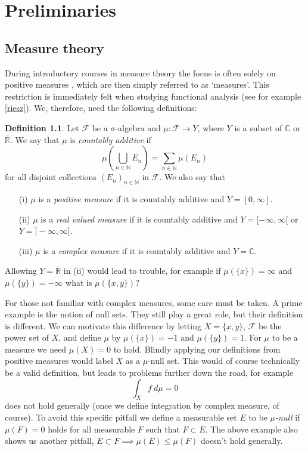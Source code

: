 \documentclass[a4paper,12pt,twoside,BCOR=10mm]{scrbook}
\theoremstyle{definition}
\theoremstyle{definition}
\theoremstyle{definition}
\newtheorem{definition}[theorem]{Definition}
\begin{document}
\chapter{Preliminaries}
\section{Measure theory}
During introductory courses in measure theory the focus is often solely on positive measures \citep{tao}, which are then simply referred to as `measures'.
This restriction is immediately felt when studying functional analysis (see for example \ref{riesz}).
We, therefore, need the following definitions:
\begin{definition}
Let $\mathcal{F}$ be a $\sigma$-algebra and $\mu: \mathcal{F} \rightarrow Y$, where $Y$ is a subset of $\mathbb{C}$ or $\overline{\mathbb{R}}$.
We say that $\mu$ is \emph{countably additive} if
\[
	\mu\left( \bigcup_{n \in \mathbb{N}} E_n \right ) = \sum_{n \in \mathbb{N}} \mu(E_n)
\]
for all disjoint collections $(E_n)_{n \in \mathbb{N}}$ in $\mathcal{F}$.
We also say that
\begin{enumerate}
\item[(i)] $\mu$ is a \emph{positive measure} if it is countably additive and $Y = [0, \infty]$.
\item[(ii)] $\mu$ is a \emph{real valued measure} if it is countably additive and $Y = [-\infty, \infty[$ or $Y = ]-\infty, \infty]$.
\item[(iii)] $\mu$ is a \emph{complex measure} if it is countably additive and $Y = \mathbb{C}$.
\end{enumerate}
\end{definition}
Allowing $Y = \overline{\mathbb{R}}$ in (ii) would lead to trouble, for example if $\mu(\{x\}) = \infty$ and $\mu(\{y\}) = -\infty$ what is $\mu(\{x, y\})$?

For those not familiar with complex measures, some care must be taken.
A prime example is the notion of null sets.
They still play a great role, but their definition is different.
We can motivate this difference by letting $X = \{x, y\}$, $\mathcal{F}$ be the power set of $X$, and define $\mu$ by $\mu(\{x\}) = -1$ and $\mu(\{y\}) = 1$.
For $\mu$ to be a measure we need $\mu(X) = 0$ to hold.
Blindly applying our definitions from positive measures would label $X$ as a $\mu$-null set.
This would of course technically be a valid definition, but leads to problems further down the road, for example
\[
	\int_X f\ d\mu = 0
\]
does not hold generally (once we define integration by complex measure, of course).
To avoid this specific pitfall we define a measurable set $E$ to be \emph{$\mu$-null} if $\mu(F) = 0$ holds for all measurable $F$ such that $F \subset E$.
The above example also shows us another pitfall, $E \subset F \implies \mu(E) \leq \mu(F)$ doesn't hold generally.
\end{document}
